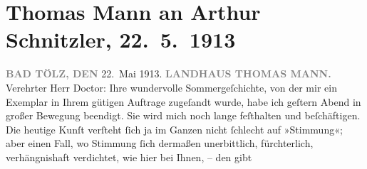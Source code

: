 

         
         \renewcommand{\erwaehntePersonen}{Personen: Alfred Kerr, Thomas Mann, Olga Schnitzler}
         \renewcommand{\erwaehnteOrte}{Orte: Bad Tölz, Thomas Mann Villa, Wien}
         \renewcommand{\erwaehnteWerke}{Werke: Der Tod in Venedig, Frau Beate und ihr Sohn. Novelle, Tagebuch}
               \section[Thomas Mann an Arthur Schnitzler, 22. 5. 1913]{ Thomas Mann an Arthur Schnitzler, 22. 5. 1913}\nopagebreak{}\rehead{ }\begin{ledgroupsized}[t]{13cm}\normalsize\beginnumbering \toendnotes[C]{\smallbreak\pagebreak[2]} 
\toendnotes[C]{\smallbreak}\pstart
           \noindent{}\raggedleft{}{\pb}\textcolor{gray}{\textbf{BAD TÖLZ, DEN}}{ }22. Mai 1913.\pend
           \pstart
           \noindent{}\raggedleft{}\textcolor{gray}{\textbf{LANDHAUS THOMAS MANN.}}\pend
           \pstart{}Verehrter Herr Doctor:\pend\pstart
           Ihre wundervolle Sommergeſchichte, von der mir ein Exemplar in Ihrem gütigen Auftrage
               zugeſandt wurde, habe ich geſtern Abend in großer Bewegung beendigt. Sie wird mich
               noch lange feſthalten und beſchäftigen. Die heutige Kunſt verſteht ſich ja im Ganzen
               nicht ſchlecht auf »Stimmung«; aber einen Fall, wo Stimmung ſich dermaßen
               unerbittlich, fürchterlich, verhängnishaft verdichtet, wie hier bei Ihnen, – den gibt

\end{ledgroupsized}
